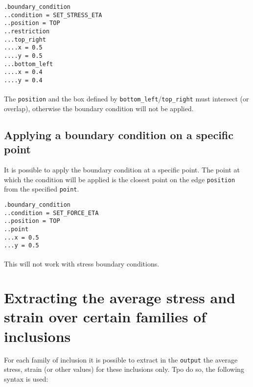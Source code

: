 \documentclass[10pt]{article}
\begin{document}
\noindent \verb+.boundary_condition+\\
\verb+..condition = SET_STRESS_ETA+\\
\verb+..position = TOP+\\
\verb+..restriction+\\
\verb+...top_right+\\
\verb+....x = 0.5+\\
\verb+....y = 0.5+\\
\verb+...bottom_left+\\
\verb+....x = 0.4+\\
\verb+....y = 0.4+

\paragraph{} The \verb+position+ and the box defined by \verb+bottom_left+/\verb+top_right+ must intersect (or overlap), otherwise the boundary condition will not be applied.

\subsection{Applying a boundary condition on a specific point}

It is possible to apply the boundary condition at a specific point. The point at which the condition will be applied is the closest point on the edge \verb+position+ from the specified \verb+point+.

\noindent \verb+.boundary_condition+\\
\verb+..condition = SET_FORCE_ETA+\\
\verb+..position = TOP+\\
\verb+..point+\\
\verb+...x = 0.5+\\
\verb+...y = 0.5+

\paragraph{} This will not work with stress boundary conditions.



\section{Extracting the average stress and strain over certain families of inclusions}

For each family of inclusion it is possible to extract in the \verb+output+ the average stress, strain (or other values) for these inclusions only. Tpo do so, the following syntax is used:\\
\end{document}
